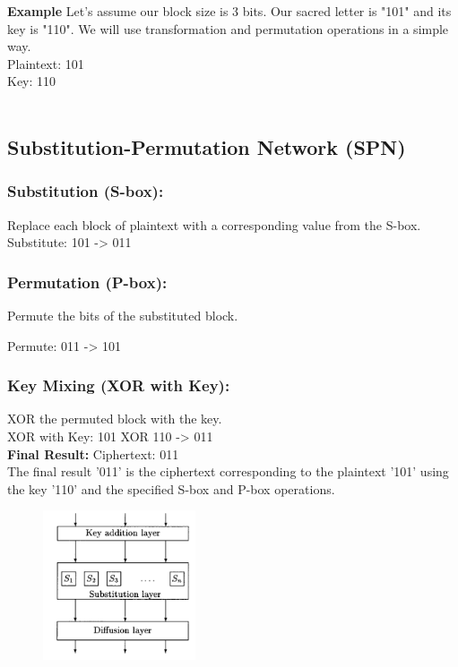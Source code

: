 \documentclass[11pt]{article}
\begin{document}
\begin{itemize}
    \textbf{Example}
Let's assume our block size is 3 bits. Our sacred letter is "101" and its key is "110". We will use transformation and permutation operations in a simple way.\\

Plaintext: 101\\
Key: 110\\\\

 \subsection{Substitution-Permutation Network (SPN)}

 \subsubsection{Substitution (S-box):} Replace each block of plaintext with a corresponding value from the S-box.\\

Substitute: 101 -> 011\\

 \subsubsection{Permutation (P-box):}  Permute the bits of the substituted block.

Permute: 011 -> 101\\

\subsubsection{Key Mixing (XOR with Key):}
XOR the permuted block with the key.
\\
XOR with Key: 101 XOR 110 -> 011
\\
\textbf{Final Result:}
Ciphertext: 011\\
The final result '011' is the ciphertext corresponding to the plaintext '101' using the key '110' and the specified S-box and P-box operations.


\begin{figure}
    \centering
    \includegraphics[width=0.4\textwidth]{image2.1.PNG} %
    \caption{} %
\end{figure}

\end{itemize}
\end{document}
